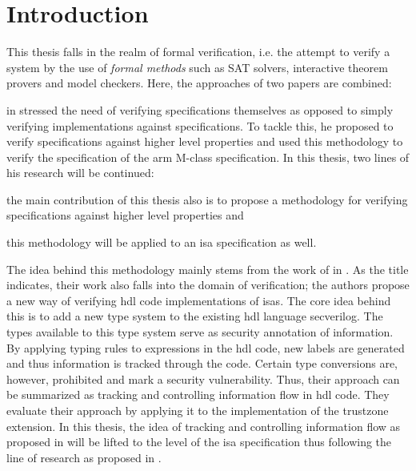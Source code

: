 
\section{Introduction}
\label{sec:introduction}

This thesis falls in the realm of formal verification, i.e. the attempt to verify a system by the use of \textit{formal methods} such as SAT solvers, interactive theorem provers and model checkers.
Here, the approaches of two papers are combined:

\citeauthor{Reid17} in  \cite{Reid17} stressed the need of verifying specifications themselves as opposed to simply verifying implementations against specifications.
To tackle this, he proposed to verify specifications against higher level properties and used this methodology to verify the specification of the \gls{arm} M-class specification.
In this thesis, two lines of his research will be continued: \begin{enumerate*}[label=\alph*)]
    \item the main contribution of this thesis also is to propose a methodology for verifying specifications against higher level properties and
    \item this methodology will be applied to an \gls{isa} specification as well.
\end{enumerate*}

The idea behind this methodology mainly stems from the work of \citeauthor{Ferraiuolo17} in  \cite{Ferraiuolo17}.
As the title indicates, their work also falls into the domain of verification; the authors propose a new way of verifying \gls{hdl} code implementations of \glspl{isa}.
The core idea behind this is to add a new type system to the existing \gls{hdl} language \gls{secverilog}.
The types available to this type system serve as security annotation of information.
By applying typing rules to expressions in the \gls{hdl} code, new labels are generated and thus information is tracked through the code.
Certain type conversions are, however, prohibited and mark a security vulnerability.
Thus, their approach can be summarized as tracking and controlling information flow in \gls{hdl} code.
They evaluate their approach by applying it to the implementation of the \gls{trustzone} extension.
In this thesis, the idea of tracking and controlling information flow as proposed in \cite{Ferraiuolo17} will be lifted to the level of the \gls{isa} specification thus following the line of research as proposed in \cite{Reid17}.

